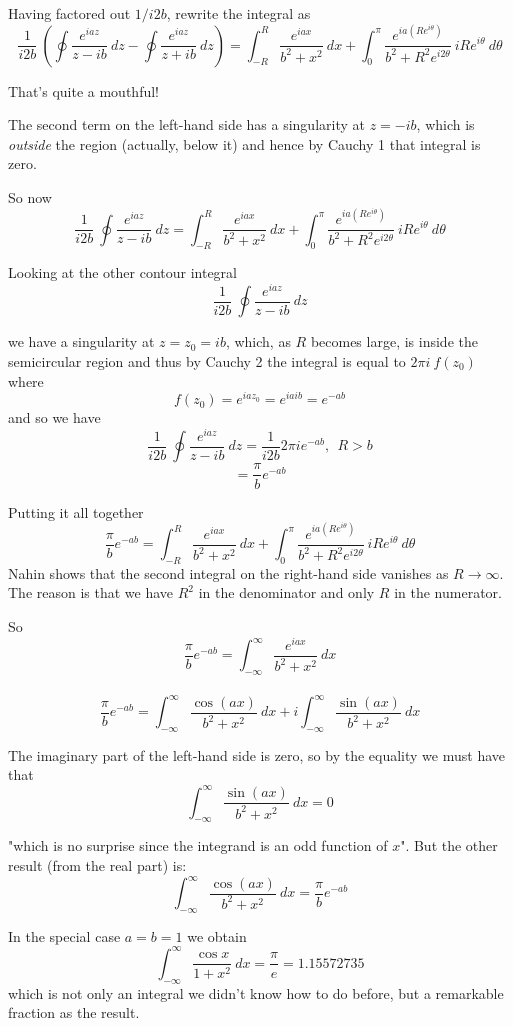 \documentclass[11pt, oneside]{article}
\begin{document}
Having factored out $1/i2b$, rewrite the integral as
\[ \frac{1}{i2b} \ (\oint \frac{e^{iaz}}{z-ib} \ dz - \oint \frac{e^{iaz}}{z + ib} \ dz) = \int_{-R}^R \frac{e^{iax}}{b^2 + x^2} \ dx + \int_0^{\pi}  \frac{e^{ia(Re^{i\theta})}}{b^2 + R^2e^{i2\theta}}  \ iRe^{i\theta} \ d \theta \]

That's quite a mouthful!

The second term on the left-hand side has a singularity at $z = -ib$, which is \emph{outside} the region (actually, below it) and hence by Cauchy 1 that integral is zero.

So now
\[ \frac{1}{i2b} \ \oint \frac{e^{iaz}}{z-ib} \ dz  = \int_{-R}^R \frac{e^{iax}}{b^2 + x^2} \ dx + \int_0^{\pi}  \frac{e^{ia(Re^{i\theta})}}{b^2 + R^2e^{i2\theta}}  \ iRe^{i\theta} \ d \theta \]

Looking at the other contour integral 
\[ \frac{1}{i2b} \ \oint \frac{e^{iaz}}{z-ib} \ dz  \]

we have a singularity at $z = z_0 = ib$, which, as $R$ becomes large, is inside the semicircular region and thus by Cauchy 2 the integral is equal to $2 \pi i \ f(z_0)$ where
\[ f(z_0) = e^{iaz_0} = e^{iaib} = e^{-ab} \]
and so we have
\[ \frac{1}{i2b} \ \oint \frac{e^{iaz}}{z-ib} \ dz = \frac{1}{i2b} 2 \pi i e^{-ab}, \ \ R > b \]
\[ = \frac{\pi}{b} e^{-ab} \]

Putting it all together
\[ \frac{\pi}{b} e^{-ab} = \int_{-R}^R \frac{e^{iax}}{b^2 + x^2} \ dx + \int_0^{\pi}  \frac{e^{ia(Re^{i\theta})}}{b^2 + R^2e^{i2\theta}}  \ iRe^{i\theta} \ d \theta \]
Nahin shows that the second integral on the right-hand side vanishes as $R \rightarrow \infty$.  The reason is that we have $R^2$ in the denominator and only $R$ in the numerator.

So
\[ \frac{\pi}{b} e^{-ab} = \int_{-\infty}^{\infty} \frac{e^{iax}}{b^2 + x^2} \ dx \]\
\[ \frac{\pi}{b} e^{-ab} = \int_{-\infty}^{\infty} \frac{\cos(ax)}{b^2 + x^2} \ dx + i  \int_{-\infty}^{\infty} \frac{\sin(ax)}{b^2 + x^2} \ dx \]

The imaginary part of the left-hand side is zero, so by the equality we must have that
\[ \int_{-\infty}^{\infty} \frac{\sin(ax)}{b^2 + x^2} \ dx = 0 \]

"which is no surprise since the integrand is an odd function of $x$".  But the other result (from the real part) is:
\[ \int_{-\infty}^{\infty} \frac{\cos(ax)}{b^2 + x^2} \ dx = \frac{\pi}{b} e^{-ab} \]

In the special case $a = b = 1$ we obtain
\[ \int_{-\infty}^{\infty} \frac{\cos x }{1 + x^2} \ dx = \frac{\pi}{e} = 1.15572735 \]
which is not only an integral we didn't know how to do before, but a remarkable fraction as the result.
\end{document}
